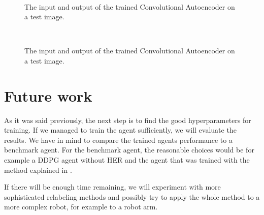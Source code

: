 \documentclass[conference]{IEEEtran}
\begin{document}
\begin{figure}[h!]
	\begin{center}
		~
	\end{center}
	\vspace{-4mm}
	\caption{The input and output of the trained Convolutional Autoencoder on a test image.}
	\label{fig:3}
	\vspace{-0mm}
\end{figure}

\begin{figure}[h!]
	\begin{center}
		~
	\end{center}
	\vspace{-4mm}
	\caption{The input and output of the trained Convolutional Autoencoder on a test image.}
	\label{fig:4}
	\vspace{-0mm}
\end{figure}



\section{Future work}

As it was said previously, the next step is to find the good hyperparameters for training. If we managed to train the agent sufficiently, we will evaluate the results. We have in mind to compare the trained agents performance to a benchmark agent. For the benchmark agent, the reasonable choices would be for example a DDPG agent without HER and the agent that was trained with the method explained in \cite{NMP}.

If there will be enough time remaining, we will experiment with more sophisticated relabeling methods and possibly try to apply the whole method to a more complex robot, for example to a robot arm.




		
\end{document}
